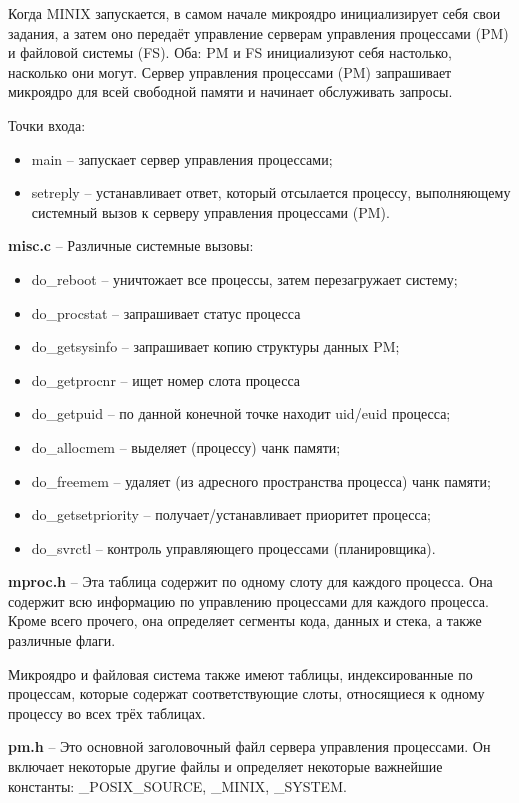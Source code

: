 Когда MINIX запускается, в самом начале микроядро инициализирует себя свои задания, а затем оно передаёт управление серверам управления процессами (PM) и файловой системы (FS). Оба: PM и FS инициализуют себя настолько, насколько они могут. Сервер управления процессами (PM) запрашивает микроядро для всей свободной памяти и начинает обслуживать запросы.

Точки входа:
\begin{itemize}
\item main -- запускает сервер управления процессами;
\item setreply -- устанавливает ответ, который отсылается процессу, выполняющему системный вызов к серверу управления процессами (PM).
\end{itemize}

\textbf{misc.c} -- Различные системные вызовы:
\begin{itemize}
\item do\_reboot -- уничтожает все процессы, затем перезагружает систему;
\item do\_procstat -- запрашивает статус процесса
\item do\_getsysinfo -- запрашивает копию структуры данных PM;
\item do\_getprocnr -- ищет номер слота процесса
\item do\_getpuid -- по данной конечной точке находит uid/euid процесса;
\item do\_allocmem -- выделяет (процессу) чанк памяти;
\item do\_freemem -- удаляет (из адресного пространства процесса) чанк памяти;
\item do\_getsetpriority -- получает/устанавливает приоритет процесса;
\item do\_svrctl -- контроль управляющего процессами (планировщика).
\end{itemize}

\textbf{mproc.h} -- Эта таблица содержит по одному слоту для каждого процесса. Она содержит всю информацию по управлению процессами для каждого процесса. Кроме всего прочего, она определяет сегменты кода, данных и стека, а также различные флаги.

Микроядро и файловая система также имеют таблицы, индексированные по процессам, которые содержат соответствующие слоты, относящиеся к одному процессу во всех трёх таблицах.

\textbf{pm.h} -- Это основной заголовочный файл сервера управления процессами. Он включает некоторые другие файлы и определяет некоторые важнейшие константы: \_POSIX\_SOURCE, \_MINIX, \_SYSTEM.

